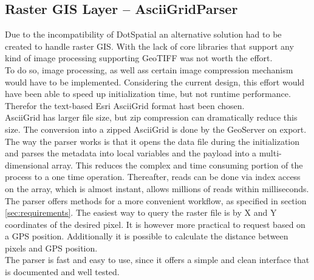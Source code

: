 \subsection{Raster GIS Layer -- AsciiGridParser}
\label{sec:parser}
Due to the incompatibility of DotSpatial an alternative solution had to be created to handle raster GIS. With the lack of core libraries that support any kind of image processing supporting GeoTIFF was not worth the effort.\\
To do so, image processing, as well ass certain image compression mechanism would have to be implemented. Considering the current design, this effort would have been able to speed up initialization time, but not runtime performance. Therefor the text-based Esri AsciiGrid format hast been chosen.\\
AsciiGrid has larger file size, but zip compression can dramatically reduce this size. The conversion into a zipped AsciiGrid is done by the GeoServer on export.\\
The way the parser works is that it opens the data file during the initialization and parses the metadata into local variables and the payload into a multi-dimensional array. This reduces the complex and time consuming portion of the process to a one time operation. Thereafter, reads can be done via index access on the array, which is almost instant, allows millions of reads within milliseconds.\\
The parser offers methods for a more convenient workflow, as specified in section \ref{sec:requirements}. The easiest way to query the raster file is by X and Y coordinates of the desired pixel. It is however more practical to request based on a GPS position. Additionally it is possible to calculate the distance between pixels and GPS position.\\
The parser is fast and easy to use, since it offers a simple and clean interface that is documented and well tested.